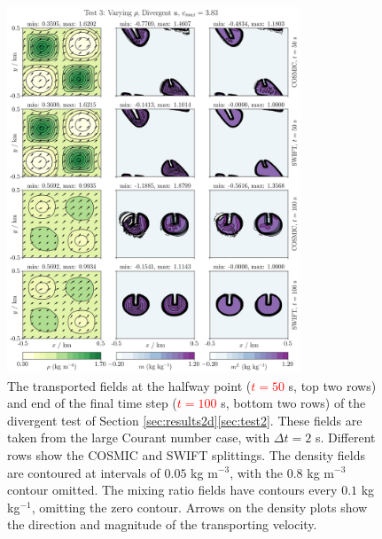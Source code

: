 \documentclass{ametsocV6.1}
\newcommand{\change}[1]{\textcolor{red}{#1}}
\begin{document}
\begin{figure}[ht!]
\centering
\includegraphics[width=0.78\textwidth]{fig_5_divergent.jpg}
\caption{The transported fields at the halfway point (\change{$t=50$} s, top two rows) and end of the final time step (\change{$t=100$} s, bottom two rows) of the divergent test of Section \ref{sec:results2d}\ref{sec:test2}. These fields are taken from the large Courant number case, with $\Delta t=2$ s. Different rows show the COSMIC and SWIFT splittings.
The density fields are contoured at intervals of $0.05$ kg m$^{-3}$, with the $0.8$ kg m$^{-3}$ contour omitted.
The mixing ratio fields have contours every $0.1$ kg kg$^{-1}$, omitting the zero contour.
Arrows on the density plots show the direction and magnitude of the transporting velocity.}\label{fig:test3}
\end{figure} \\
\end{document}
